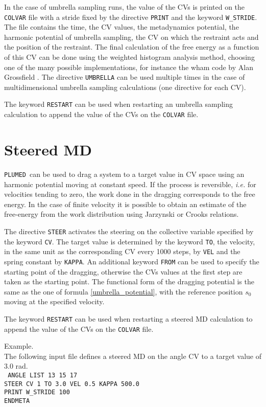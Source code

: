 \documentclass[12pt,fleqn]{report}
\newcommand{\keyword}[1]{\index{Keywords!{\tt #1}} {\tt #1}}
\newcommand{\plumed}{{\tt PLUMED}}
\newcommand{\esempio}[1]{
\vspace{10pt}
\begin{flushright}
\colorbox{light-gray}{
   \begin{minipage}{13cm}
       \scriptsize{
{\fontfamily{phv} \fontseries{b}
 \selectfont Example. \\
 \fontseries{m} \selectfont #1 } }
\end{minipage}}
\end{flushright}
\vspace{20pt}
}
\begin{document}
In the case of umbrella sampling runs, 
 the value of the CVs is printed on the {\tt COLVAR} file with a stride
 fixed by the directive {\tt PRINT} and the keyword {\tt W\_STRIDE}. 
The file contains the time, the CV values, the
metadynamics potential, the harmonic potential of umbrella sampling,
the CV on which the restraint acts and the position of the restraint.
The final calculation of the free energy as a function of this 
CV can be done using the weighted histogram analysis method,
 choosing one of the many possible 
 implementations, for instance the wham code by Alan Grossfield 
 \cite{grossfield}.
 The directive {\tt UMBRELLA} can be used multiple times in the case of  multidimensional
 umbrella sampling calculations (one directive for each CV).

The keyword {\tt RESTART} can be used when restarting an umbrella
sampling calculation to append the value of the CVs on the {\tt COLVAR} file.
\section{Steered MD}
\plumed \ can be used to drag a system to a target value in
CV space using an harmonic potential moving at constant speed.
If the process is reversible, \emph{i.e.} for velocities tending to zero, the work
done in the dragging corresponds to the free energy.  In the case of finite
velocity it is possible to obtain an estimate of the free-energy from the work
distribution using Jarzynski \cite{jarzynski} or Crooks \cite{Crooks98}
relations.

The directive \keyword{STEER} activates the steering on the collective
variable specified by the keyword {\tt CV}. The target value is determined by
the keyword {\tt TO}, the velocity, in the same unit as the corresponding CV every 1000 steps,
by {\tt VEL} and the spring constant by {\tt KAPPA}. An additional keyword {\tt FROM} 
can be used to specify the starting point of the dragging, otherwise the CVs values at the first step
are taken as the starting point.
The functional form of the dragging potential is the same as the one of
formula \ref{umbrella_potential}, with the reference position $s_0$ moving 
at the specified velocity.

The keyword {\tt RESTART} can be used when restarting a steered MD
calculation to append the value of the CVs on the {\tt COLVAR} file.

\esempio{The following input file defines a steered MD on the angle CV to a
target value of 3.0 rad.  \vspace{10pt}\\
{\tt
ANGLE LIST 13 15 17 \\
STEER CV 1 TO 3.0 VEL 0.5 KAPPA 500.0 \\
PRINT W\_STRIDE 100 \\
ENDMETA}}
\end{document}

